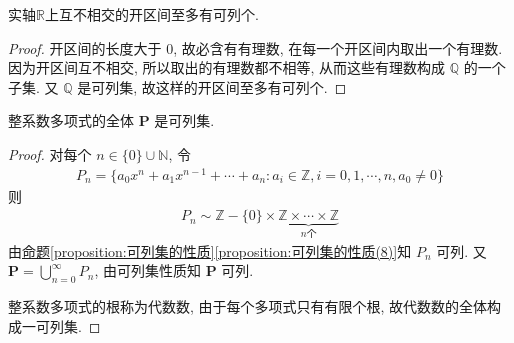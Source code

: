 \documentclass[../../main.tex]{subfiles}
\begin{document}
\begin{proposition}\label{proposition:实轴上互不相交的开区间至多有可列个}
实轴$\mathbb{R}$上互不相交的开区间至多有可列个.
\end{proposition}
\begin{proof}
开区间的长度大于 $0$, 故必含有有理数, 在每一个开区间内取出一个有理数. 因为开区间互不相交, 所以取出的有理数都不相等, 从而这些有理数构成 $\mathbb{Q}$ 的一个子集. 又 $\mathbb{Q}$ 是可列集, 故这样的开区间至多有可列个.
\end{proof}

\begin{example}
整系数多项式的全体 $\mathbf{P}$ 是可列集.
\end{example}
\begin{proof}
对每个 $n \in \{0\} \cup \mathbb{N}$, 令
\begin{align*}
P_n = \{a_0x^n + a_1x^{n - 1} + \cdots + a_n : a_i \in \mathbb{Z}, i = 0, 1, \cdots, n, a_0 \neq 0\}
\end{align*}
则
\begin{align*}
P_n \sim \mathbb{Z} - \{0\} \times \underbrace{\mathbb{Z} \times \cdots \times \mathbb{Z}}_{n 个}
\end{align*}
由\hyperref[proposition:可列集的性质(8)]{命题\ref{proposition:可列集的性质}\ref{proposition:可列集的性质(8)}}知 $P_n$ 可列. 又 $\mathbf{P} = \bigcup_{n = 0}^{\infty} P_n$, 由可列集性质知 $\mathbf{P}$ 可列.

整系数多项式的根称为代数数, 由于每个多项式只有有限个根, 故代数数的全体构成一可列集.
\end{proof}
\end{document}
